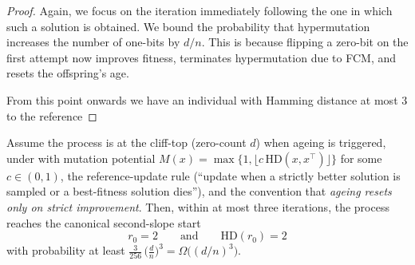 \documentclass[lettersize,journal]{IEEEtran}
\newcommand{\HD}{\text{HD}}
\begin{document}
\begin{proof}
Again, we focus on the iteration immediately following the one in which such a solution is obtained. We bound the probability that hypermutation increases the number of one-bits by $d/n$. This is because flipping a zero-bit on the first attempt now improves fitness, terminates hypermutation due to FCM, and resets the offspring's age.

From this point onwards we have an individual with Hamming distance at most 3 to the reference

\end{proof}

\begin{lemma}\label{lem:can-start-omega-d3}
	Assume the process is at the cliff-top (zero-count $d$) when ageing is triggered, under \IPHfcm{} with mutation potential $M(x)=\max\{1,\lfloor c\,\HD(x,x^\top)\rfloor\}$ for some $c\in(0,1)$, the reference-update rule (“update when a strictly better solution is sampled or a best-fitness solution dies”), and the convention that \emph{ageing resets only on strict improvement}. Then, within at most three iterations, the process reaches the canonical second-slope start
	\[
	r_0=2\qquad\text{and}\qquad \HD(r_0)=2
	\]
	with probability at least $\displaystyle \frac{3}{256}\,\bigl(\tfrac{d}{n}\bigr)^{3}=\Omega\!\bigl((d/n)^3\bigr)$.
\end{lemma}
\end{document}
